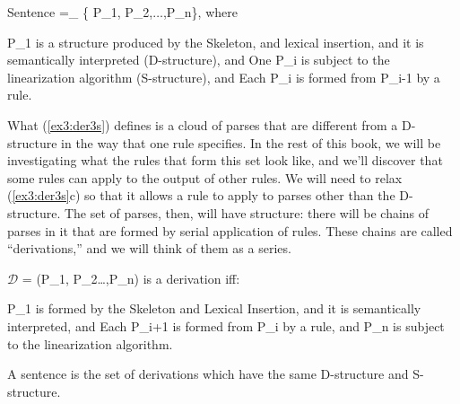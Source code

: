 \begin{exe}
	\raggedright
	\ex \label{ex3:der3s} 
	Sentence =_{} \{ P_1, P_2,$\ldots$,P_n\}, where
	\begin{xlist}
		\ex P_1 is a structure produced by the  Skeleton, and lexical insertion, and it is semantically interpreted (D-structure), and
		\ex One P_i is subject to the linearization algorithm (S-structure), and
		\ex Each P_{i } is formed from P_{i-1} by a rule.
	\end{xlist}
\end{exe}

What (\ref{ex3:der3s}) defines is a cloud of parses that are different from a D-structure in the way that one rule specifies. In the rest of this book, we will be investigating what the rules that form this set look like, and we'll discover that some rules can apply to the output of other rules. We will need to relax (\ref{ex3:der3s}c) so that it allows a rule to apply to parses other than the D-structure. The set of parses, then, will have structure: there will be chains of parses in it that are formed by serial application of rules. These chains are called ``derivations,'' and we will think of them as a series.
\begin{exe}
	\raggedright
	\ex \label{ex3:deriv} 
	$\mathcal{D}$ = (P_1, P_2\ldots,P_n) is a derivation iff:
	\begin{xlist}
		\ex P_1 is formed by the  Skeleton and Lexical Insertion, and it is semantically interpreted, and
		\ex Each P_{i+1} is formed from P_{i} by a rule, and
		\ex P_n is subject to the linearization algorithm.
	\end{xlist}
	\ex A sentence is the set of derivations which have the same D-structure and S-structure.
\end{exe}

